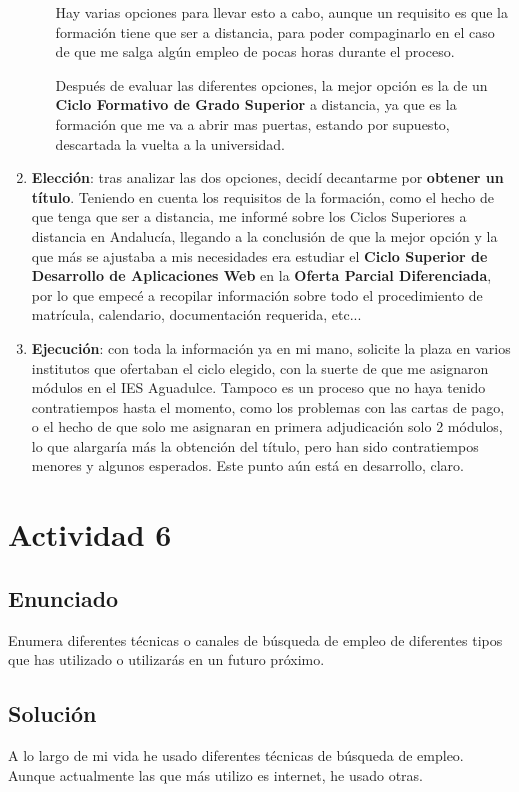 \begin{enumerate}
\begin{itemize}
       Hay varias opciones para llevar esto a cabo, aunque un requisito es que la formación tiene que ser a distancia, para poder compaginarlo en el caso de que me salga algún empleo de pocas horas durante el proceso.

       Después de evaluar las diferentes opciones, la mejor opción es la de un \textbf{Ciclo Formativo de Grado Superior} a distancia, ya que es la formación que me va a abrir mas puertas, estando por supuesto, descartada la vuelta a la universidad.
     \end{itemize}

     \item \textbf{Elección}: tras analizar las dos opciones, decidí decantarme por \textbf{obtener un título}. Teniendo en cuenta los requisitos de la formación, como el hecho de que tenga que ser a distancia, me informé sobre los Ciclos Superiores a distancia en Andalucía, llegando a la conclusión de que la mejor opción y la que más se ajustaba a mis necesidades era estudiar el \textbf{Ciclo Superior de Desarrollo de Aplicaciones Web} en la \textbf{Oferta Parcial Diferenciada}, por lo que empecé a recopilar información sobre todo el procedimiento de matrícula, calendario, documentación requerida, etc...

     \item \textbf{Ejecución}: con toda la información ya en mi mano, solicite la plaza en varios institutos que ofertaban el ciclo elegido, con la suerte de que me asignaron módulos en el IES Aguadulce. Tampoco es un proceso que no haya tenido contratiempos hasta el momento, como los problemas con las cartas de pago, o el hecho de que solo me asignaran en primera adjudicación solo 2 módulos, lo que alargaría más la obtención del título, pero han sido contratiempos menores y algunos esperados. Este punto aún está en desarrollo, claro.
\end{enumerate}

\section{Actividad 6}
\subsection{Enunciado}
Enumera diferentes técnicas o canales de búsqueda de empleo de diferentes tipos que has utilizado o utilizarás en un futuro próximo.

\subsection{Solución}
A lo largo de mi vida he usado diferentes técnicas de búsqueda de empleo. Aunque actualmente las que más utilizo es internet, he usado otras.

